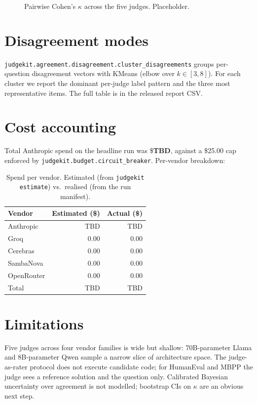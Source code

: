 \documentclass[11pt,a4paper]{article}
\begin{document}
\begin{figure}[ht]
\centering
\caption{Pairwise Cohen's $\kappa$ across the five judges. Placeholder.}
\label{fig:kappa-heatmap}
\end{figure}

\section{Disagreement modes}
\texttt{judgekit.agreement.disagreement.cluster\_disagreements} groups per-question
disagreement vectors with KMeans (elbow over $k \in [3,8]$). For each cluster we report
the dominant per-judge label pattern and the three most representative items. The full
table is in the released report CSV.

\section{Cost accounting}
\label{sec:numbers}
Total Anthropic spend on the headline run was \$\textbf{TBD}, against a \$25.00 cap
enforced by \texttt{judgekit.budget.circuit\_breaker}. Per-vendor breakdown:

\begin{table}[ht]
\centering
\caption{Spend per vendor. Estimated (from \texttt{judgekit estimate}) vs.\
realised (from the run manifest).}
\label{tab:spend}
\begin{tabular}{lrr}
\toprule
Vendor & Estimated (\$) & Actual (\$) \\
\midrule
Anthropic   & TBD & TBD \\
Groq        & 0.00 & 0.00 \\
Cerebras    & 0.00 & 0.00 \\
SambaNova   & 0.00 & 0.00 \\
OpenRouter  & 0.00 & 0.00 \\
\midrule
Total       & TBD & TBD \\
\bottomrule
\end{tabular}
\end{table}

\section{Limitations}
Five judges across four vendor families is wide but shallow: 70B-parameter Llama and
8B-parameter Qwen sample a narrow slice of architecture space. The judge-as-rater protocol
does not execute candidate code; for HumanEval and MBPP the judge sees a reference
solution and the question only. Calibrated Bayesian uncertainty over agreement is not
modelled; bootstrap CIs on $\kappa$ are an obvious next step.



\end{document}

